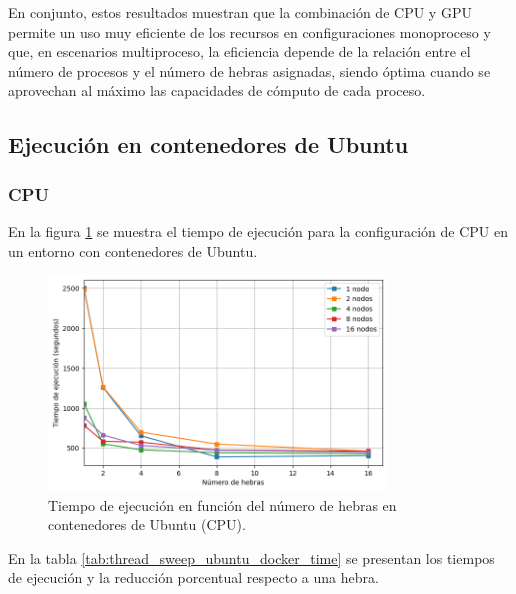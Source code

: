 En conjunto, estos resultados muestran que la combinación de CPU y GPU permite un uso muy eficiente de los recursos en configuraciones monoproceso y que, en escenarios multiproceso, la eficiencia depende de la relación entre el número de procesos y el número de hebras asignadas, siendo óptima cuando se aprovechan al máximo las capacidades de cómputo de cada proceso.


\subsection{Ejecución en contenedores de Ubuntu}
\subsubsection{CPU}

En la figura \ref{fig:thread_sweep_ubuntu_docker_time} se muestra el tiempo de ejecución para la configuración de CPU en un entorno con contenedores de Ubuntu.

\begin{figure}[H]
    \centering
    \includegraphics[width=0.8\textwidth]{imagenes/cap5/thread_sweep_ubuntu_docker_time.png}
    \caption{Tiempo de ejecución en función del número de hebras en contenedores de Ubuntu (CPU).}
    \label{fig:thread_sweep_ubuntu_docker_time}
\end{figure}

En la tabla \ref{tab:thread_sweep_ubuntu_docker_time} se presentan los tiempos de ejecución y la reducción porcentual respecto a una hebra.

